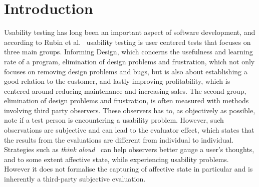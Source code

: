 
\section{Introduction}

Usability testing has long been an important aspect of software development, and according to Rubin et al.~\cite{rubin2008handbook} usability testing is user centered tests that focuses on three main groups.
Informing Design, which concerns the usefulness and learning rate of a program,
elimination of design problems and frustration, which not only focuses on removing design problems and bugs, but is also about establishing a good relation to the customer, and lastly improving profitability, which is centered around reducing maintenance and increasing sales.
The second group, elimination of design problems and frustration, is often measured with methods involving third party observers.
These observers has to, as objectively as possible, note if a test person is encountering a usability problem.
However, such observations are subjective and can lead to the evaluator effect\cite{eval_effect}, which states that the results from the evaluations are different from individual to individual.
Strategies such as \textit{think aloud}~\cite{use_of_TA_and_IDA} can help observers better gauge a user's
thoughts, and to some extent affective state, while experiencing usability problems. However it does
not formalise the capturing of affective state in particular and is inherently a third-party
subjective evaluation. 

